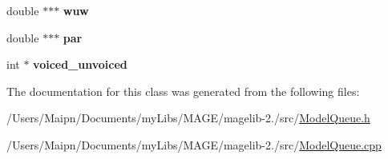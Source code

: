 \begin{DoxyCompactItemize}
\item 
\hypertarget{class_m_a_g_e_1_1_model_queue_memory_ae4956587c224f47c013fbade1181716e}{double $\ast$$\ast$$\ast$ {\bfseries wuw}}\label{class_m_a_g_e_1_1_model_queue_memory_ae4956587c224f47c013fbade1181716e}

\item 
\hypertarget{class_m_a_g_e_1_1_model_queue_memory_aebc11b875893cb9f893042acda3654d0}{double $\ast$$\ast$$\ast$ {\bfseries par}}\label{class_m_a_g_e_1_1_model_queue_memory_aebc11b875893cb9f893042acda3654d0}

\item 
\hypertarget{class_m_a_g_e_1_1_model_queue_memory_a109bd7570f9690fcc3662381042e7b05}{int $\ast$ {\bfseries voiced\-\_\-unvoiced}}\label{class_m_a_g_e_1_1_model_queue_memory_a109bd7570f9690fcc3662381042e7b05}

\end{DoxyCompactItemize}


The documentation for this class was generated from the following files\-:\begin{DoxyCompactItemize}
\item 
/\-Users/\-Maipn/\-Documents/my\-Libs/\-M\-A\-G\-E/magelib-\/2./src/\hyperlink{_model_queue_8h}{Model\-Queue.\-h}\item 
/\-Users/\-Maipn/\-Documents/my\-Libs/\-M\-A\-G\-E/magelib-\/2./src/\hyperlink{_model_queue_8cpp}{Model\-Queue.\-cpp}\end{DoxyCompactItemize}
